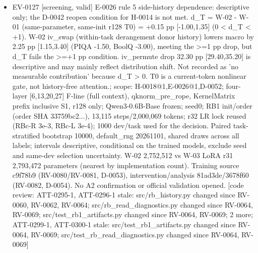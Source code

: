 \documentclass[11pt]{article}
\begin{document}
\begin{itemize}
\item EV-0127 [screening, valid] E-0026 rule 5 side-history dependence: descriptive only; the D-0042 reopen condition for H-0014 is not met. d\_T = W-02 - W-01 (same-parameter, same-init r128 T0) = +0.15 pp [-1.00,1.35] (0 \textless{} d\_T \textless{} +1). W-02 iv\_swap (within-task derangement donor history) lowers macro by 2.25 pp [1.15,3.40] (PIQA -1.50, BoolQ -3.00), meeting the \textgreater{}=1 pp drop, but d\_T fails the \textgreater{}=+1 pp condition. iv\_permute drop 32.30 pp [29.40,35.20] is descriptive and may mainly reflect distribution shift. Not recorded as 'no measurable contribution' because d\_T \textgreater{} 0. T0 is a current-token nonlinear gate, not history-free attention.; scope: H-0018@1,E-0026@1,D-0052; four-layer [6,13,20,27] F-line (full context), qknorm\_pre\_rope, KernelMatrix prefix inclusive S1, r128 only; Qwen3-0.6B-Base frozen; seed0; RB1 init/order (order SHA 33759bc2...), 13,115 steps/2,000,069 tokens; r32 LR lock reused (RBc-R 3e-3, RBc-L 3e-4); 1000 dev/task used for the decision. Paired task-stratified bootstrap 10000, default\_rng 20261101, shared draws across all labels; intervals descriptive, conditional on the trained models, exclude seed and same-dev selection uncertainty. W-02 2,752,512 vs W-03 LoRA r31 2,793,472 parameters (nearest by implementation count). Training source c9f78b9 (RV-0080/RV-0081, D-0053), intervention/analysis 81ad3de/3678f60 (RV-0082, D-0054). No A2 confirmation or official validation opened. [code review: ATT-0295-1, ATT-0296-1 stale: src/rb\_history.py changed since RV-0060, RV-0062, RV-0064; src/rb\_read\_diagnostics.py changed since RV-0064, RV-0069; src/test\_rb1\_artifacts.py changed since RV-0064, RV-0069; 2 more; ATT-0299-1, ATT-0300-1 stale: src/test\_rb1\_artifacts.py changed since RV-0064, RV-0069; src/test\_rb\_read\_diagnostics.py changed since RV-0064, RV-0069]

\end{itemize}
\end{document}
